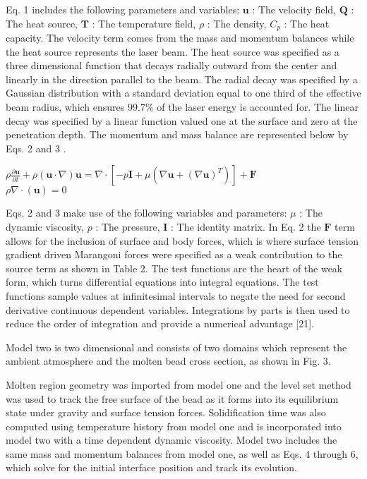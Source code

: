 \documentclass[10pt]{article}
\begin{document}
Eq. 1 includes the following parameters and variables: $\boldsymbol{u}$ : The velocity field, $\mathbf{Q}$ : The heat source, $\mathbf{T}$ : The temperature field, $\rho$ : The density, $C_{p}$ : The heat capacity. The velocity term comes from the mass and momentum balances while the heat source represents the laser beam. The heat source was specified as a three dimensional function that decays radially outward from the center and linearly in the direction parallel to the beam. The radial decay was specified by a Gaussian distribution with a standard deviation equal to one third of the effective beam radius, which ensures $99.7 \%$ of the laser energy is accounted for. The linear decay was specified by a linear function valued one at the surface and zero at the penetration depth. The momentum and mass balance are represented below by Eqs. 2 and 3 .

$\rho \frac{\partial \boldsymbol{u}}{\partial t}+\rho(\boldsymbol{u} \cdot \nabla) \boldsymbol{u}=\nabla \cdot\left[-p \boldsymbol{I}+\mu\left(\nabla \boldsymbol{u}+(\nabla \boldsymbol{u})^{T}\right)\right]+\boldsymbol{F}$\\
$\rho \nabla \cdot(\boldsymbol{u})=0$

Eqs. 2 and 3 make use of the following variables and parameters: $\mu$ : The dynamic viscosity, $p$ : The pressure, $\boldsymbol{I}$ : The identity matrix. In Eq. 2 the $\boldsymbol{F}$ term allows for the inclusion of surface and body forces, which is where surface tension gradient driven Marangoni forces were specified as a weak contribution to the source term as shown in Table 2. The test functions are the heart of the weak form, which turns differential equations into integral equations. The test functions sample values at infinitesimal intervals to negate the need for second derivative continuous dependent variables. Integrations by parts is then used to reduce the order of integration and provide a numerical advantage [21].

Model two is two dimensional and consists of two domains which represent the ambient atmosphere and the molten bead cross section, as shown in Fig. 3.

Molten region geometry was imported from model one and the level set method was used to track the free surface of the bead as it forms into its equilibrium state under gravity and surface tension forces. Solidification time was also computed using temperature history from model one and is incorporated into model two with a time dependent dynamic viscosity. Model two includes the same mass and momentum balances from model one, as well as Eqs. 4 through 6, which solve for the initial interface position and track its evolution.
\end{document}
